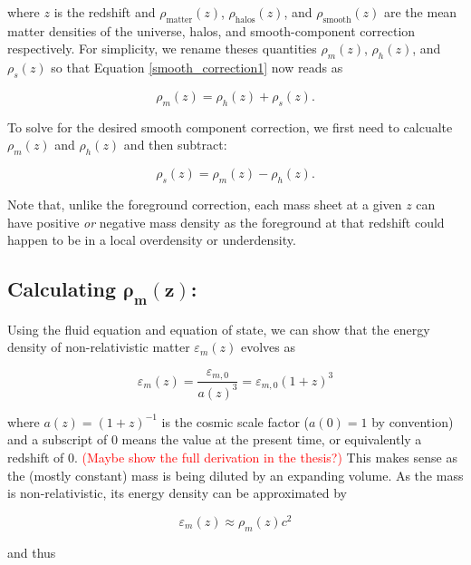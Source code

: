\documentclass[12pt]{article}
\begin{document}
where $z$ is the redshift and $\rho_{\text{matter}}(z)$, $\rho_{\text{halos}}(z)$, and $\rho_{\text{smooth}}(z)$ are the mean matter densities of the universe, halos, and smooth-component correction respectively. For simplicity, we rename theses quantities ${\rho_m(z)}$, ${\rho_h(z)}$, and ${\rho_s(z)}$ so that Equation \eqref{smooth_correction1} now reads as

\begin{equation}\label{smooth_correction2}
\rho_m(z)=\rho_h(z)+\rho_s(z).
\end{equation}

To solve for the desired smooth component correction, we first need to calcualte ${\rho_m(z)}$ and ${\rho_h(z)}$ and then subtract:

\begin{equation}\label{smooth_correction2}
\rho_s(z)=\rho_m(z)-\rho_h(z).
\end{equation}

Note that, unlike the foreground correction, each mass sheet at a given $z$ can have positive \textit{or} negative mass density as the foreground at that redshift could happen to be in a local overdensity or underdensity.

\subsection*{Calculating $\bm{\rho_m(z)}$:}

Using the fluid equation and equation of state, we can show that the energy density of non-relativistic matter $\varepsilon_m(z)$ evolves as

\begin{equation}\label{energy_evol}
\varepsilon_m(z)=\frac{\varepsilon_{m,0}}{a(z)^3}=\varepsilon_{m,0}(1+z)^3
\end{equation}

where $a(z)=(1+z)^{-1}$ is the cosmic scale factor ($a(0)=1$ by convention) and a subscript of 0 means the value at the present time, or equivalently a redshift of 0. \textcolor{red}{(Maybe show the full derivation in the thesis?)} This makes sense as the (mostly constant) mass is being diluted by an expanding volume. As the mass is non-relativistic, its energy density can be approximated by

\begin{equation*}\label{energy_mass}
\varepsilon_m(z)\approx\rho_m(z)c^2
\end{equation*}

and thus
\end{document}
